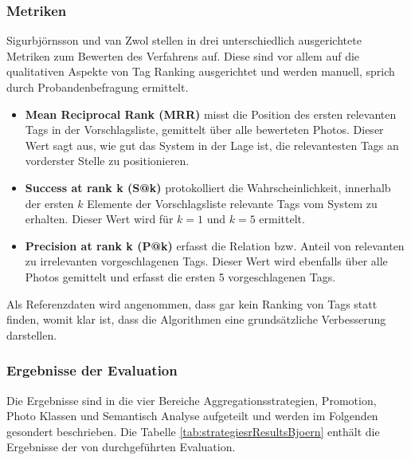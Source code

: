 \subsubsection{Metriken} %
\label{ssub:metriken}
Sigurbjörnsson und van Zwol stellen in \cite{collectiveKnowledge} drei unterschiedlich ausgerichtete Metriken zum Bewerten des Verfahrens auf. Diese sind vor allem auf die qualitativen Aspekte von Tag Ranking ausgerichtet und werden manuell, sprich durch Probandenbefragung ermittelt.
\begin{itemize}
  \item \textbf{Mean Reciprocal Rank (MRR)} misst die Position des ersten relevanten Tags in der Vorschlagsliste, gemittelt über alle bewerteten Photos. Dieser Wert sagt aus, wie gut das System in der Lage ist, die relevantesten Tags an vorderster Stelle zu positionieren.
  \item \textbf{Success at rank k (S@k)} protokolliert die Wahrscheinlichkeit, innerhalb der ersten $k$ Elemente der Vorschlagsliste relevante Tags vom System zu erhalten. Dieser Wert wird für $k = 1$ und $k = 5$ ermittelt.
  \item \textbf{Precision at rank k (P@k)} erfasst die Relation bzw. Anteil von relevanten zu irrelevanten vorgeschlagenen Tags. Dieser Wert wird ebenfalls über alle Photos gemittelt und erfasst die ersten 5 vorgeschlagenen Tags.
\end{itemize}

Als Referenzdaten wird angenommen, dass gar kein Ranking von Tags statt finden, womit klar ist, dass die Algorithmen eine grundsätzliche Verbesserung darstellen.


\subsubsection{Ergebnisse der Evaluation} %
\label{ssub:ergebnisse_der_evaluation}

Die Ergebnisse sind in die vier Bereiche Aggregationsstrategien, Promotion, Photo Klassen und Semantisch Analyse aufgeteilt und werden im Folgenden gesondert beschrieben. Die Tabelle \ref{tab:strategiesrResultsBjoern} enthält die Ergebnisse der von \cite{collectiveKnowledge} durchgeführten Evaluation. 

